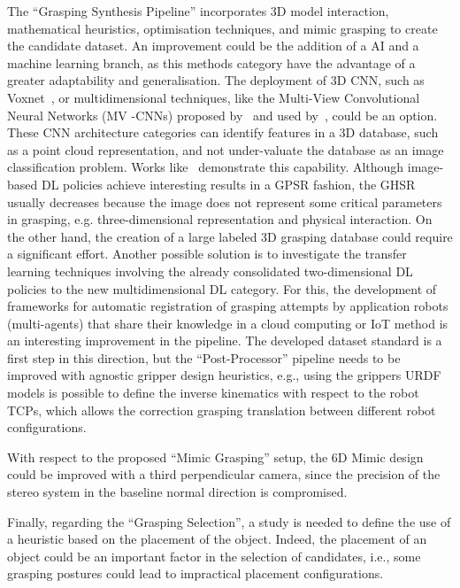 The ``Grasping Synthesis Pipeline'' incorporates 3D model interaction, mathematical heuristics, optimisation techniques, and mimic grasping to create the candidate dataset. An improvement could be the addition of a AI and a machine learning branch, as this methods category have the advantage of a greater adaptability and generalisation. The deployment of 3D \ac{CNN}, such as Voxnet~\cite{maturana2015voxnet}, or multidimensional techniques, like the Multi-View Convolutional Neural Networks (MV -CNNs) proposed by~\cite{su2015multi} and used by~\cite{Mahler2016}, could be an option. These CNN architecture categories can identify features in a 3D database, such as a point cloud representation, and not under-valuate the database as an image classification problem. Works like~\cite{choi2018learning} demonstrate this capability. Although image-based \ac{DL} policies achieve interesting results in a \ac{GPSR} fashion, the \ac{GHSR} usually decreases because the image does not represent some critical parameters in grasping, e.g. three-dimensional representation and physical interaction. On the other hand, the creation of a large labeled 3D grasping database could require a significant effort. Another possible solution is to investigate the transfer learning techniques involving the already consolidated two-dimensional \ac{DL} policies to the new multidimensional \ac{DL} category. For this, the development of frameworks for automatic registration of grasping attempts by application robots (multi-agents) that share their knowledge in a cloud computing or IoT method is an interesting improvement in the pipeline. The developed dataset standard is a first step in this direction, but the ``Post-Processor'' pipeline needs to be improved with agnostic gripper design heuristics, e.g., using the grippers URDF models is possible to define the inverse kinematics with respect to the robot \acp{TCP}, which allows the correction grasping translation between different robot configurations. 

With respect to the proposed ``Mimic Grasping'' setup, the 6D Mimic design could be improved with a third perpendicular camera, since the precision of the stereo system in the baseline normal direction is compromised.

Finally, regarding the ``Grasping Selection'', a study is needed to define the use of a heuristic based on the placement of the object. Indeed, the placement of an object could be an important factor in the selection of candidates, i.e., some grasping postures could lead to impractical placement configurations.



  








